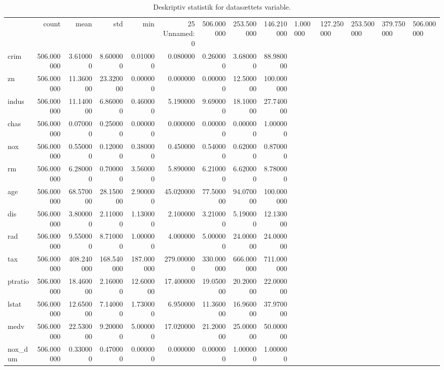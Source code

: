 \begin{table}
\caption{Deskriptiv statistik for datasættets variable.}
\label{tab:describe}
\begin{tabular}{lrrrrrrrr}
\toprule
 & count & mean & std & min & 25%
\midrule
Unnamed: 0 & 506.000000 & 253.500000 & 146.210000 & 1.000000 & 127.250000 & 253.500000 & 379.750000 & 506.000000 \\
crim & 506.000000 & 3.610000 & 8.600000 & 0.010000 & 0.080000 & 0.260000 & 3.680000 & 88.980000 \\
zn & 506.000000 & 11.360000 & 23.320000 & 0.000000 & 0.000000 & 0.000000 & 12.500000 & 100.000000 \\
indus & 506.000000 & 11.140000 & 6.860000 & 0.460000 & 5.190000 & 9.690000 & 18.100000 & 27.740000 \\
chas & 506.000000 & 0.070000 & 0.250000 & 0.000000 & 0.000000 & 0.000000 & 0.000000 & 1.000000 \\
nox & 506.000000 & 0.550000 & 0.120000 & 0.380000 & 0.450000 & 0.540000 & 0.620000 & 0.870000 \\
rm & 506.000000 & 6.280000 & 0.700000 & 3.560000 & 5.890000 & 6.210000 & 6.620000 & 8.780000 \\
age & 506.000000 & 68.570000 & 28.150000 & 2.900000 & 45.020000 & 77.500000 & 94.070000 & 100.000000 \\
dis & 506.000000 & 3.800000 & 2.110000 & 1.130000 & 2.100000 & 3.210000 & 5.190000 & 12.130000 \\
rad & 506.000000 & 9.550000 & 8.710000 & 1.000000 & 4.000000 & 5.000000 & 24.000000 & 24.000000 \\
tax & 506.000000 & 408.240000 & 168.540000 & 187.000000 & 279.000000 & 330.000000 & 666.000000 & 711.000000 \\
ptratio & 506.000000 & 18.460000 & 2.160000 & 12.600000 & 17.400000 & 19.050000 & 20.200000 & 22.000000 \\
lstat & 506.000000 & 12.650000 & 7.140000 & 1.730000 & 6.950000 & 11.360000 & 16.960000 & 37.970000 \\
medv & 506.000000 & 22.530000 & 9.200000 & 5.000000 & 17.020000 & 21.200000 & 25.000000 & 50.000000 \\
nox_dum & 506.000000 & 0.330000 & 0.470000 & 0.000000 & 0.000000 & 0.000000 & 1.000000 & 1.000000 \\
\bottomrule
\end{tabular}
\end{table}

